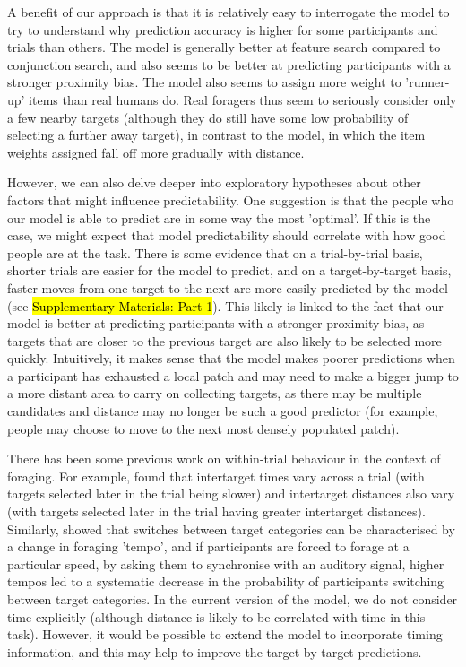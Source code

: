 \documentclass[vision,article,accept,pdftex,moreauthors]{Definitions/mdpi}
\begin{document}
A benefit of our approach is that it is relatively easy to interrogate the model to try to understand why prediction accuracy is higher for some participants and trials than others. The model is generally better at feature search compared to conjunction search, and also seems to be better at predicting participants with a stronger proximity bias. The model also seems to assign more weight to 'runner-up' items than real humans do. Real foragers thus seem to seriously consider only a few nearby targets (although they do still have some low probability of selecting a further away target), in contrast to the model, in which the item weights assigned fall off more gradually with distance.

However, we can also delve deeper into exploratory hypotheses about other factors that might influence predictability. One suggestion is that the people who our model is able to predict are in some way the most 'optimal'. If this is the case, we might expect that model predictability should correlate with how good people are at the task. There is some evidence that on a trial-by-trial basis, shorter trials are easier for the model to predict, and on a target-by-target basis, faster moves from one target to the next are more easily predicted by the model (see \hl{Supplementary Materials: Part 1}). This likely is linked to the fact that our model is better at predicting participants with a stronger proximity bias, as targets that are closer to the previous target are also likely to be selected more quickly. Intuitively, it makes sense that the model makes poorer predictions when a participant has exhausted a local patch and may need to make a bigger jump to a more distant area to carry on collecting targets, as there may be multiple candidates and distance may no longer be such a good predictor (for example, people may choose to move to the next most densely populated patch). 
 
There has been some previous work on within-trial behaviour in the context of foraging. For example, \citep{tagu2020} found that intertarget times vary across a trial (with targets selected later in the trial being slower) and intertarget distances also vary (with targets selected later in the trial having greater intertarget distances). Similarly, \citep{thornton2022foraging} showed that switches between target categories can be characterised by a change in foraging 'tempo', and if participants are forced to forage at a particular speed, by asking them to synchronise with an auditory signal, higher tempos led to a systematic decrease in the probability of participants switching between target categories. In the current version of the model, we do not consider time explicitly (although distance is likely to be correlated with time in this task). However, it would be possible to extend the model to incorporate timing information, and this may help to improve the target-by-target predictions.
 
\end{document}
